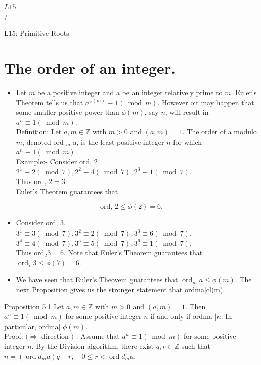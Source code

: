 \documentclass[10pt]{article}
\begin{document}
$L 15$\\
/

L15: Primitive Roots

\section*{The order of an integer.}
\begin{itemize}
  \item Let $m$ be a positive integer and a be an integer relatively prime to $m$. Euler's Theorem tells us that $a^{\phi(m)} \equiv 1(\bmod m)$. However oit may happen that some smaller positive power than $\phi(m)$, say $n$, will result in $a^{n} \equiv 1(\bmod m)$.\\
Definition: Let $a, m \in \mathbb{Z}$ with $m>0$ and $(a, m)=1$. The order of a modulo $m$, denoted ord ${ }_{m}$ a, is the least positive integer $n$ for which $a^{n} \equiv 1(\bmod m)$.\\
Example:- Consider ord, 2 . $2^{1} \equiv 2(\bmod 7), 2^{2} \equiv 4(\bmod 7), 2^{3} \equiv 1(\bmod 7)$.\\
Thus ord, $2=3$.\\
Euler's Theorem guarantees that
\end{itemize}

$$
\text { ord, } 2 \leqslant \phi(2)=6 \text {. }
$$

\begin{itemize}
  \item Consider ord, 3.\\
$3^{1} \equiv 3(\bmod 7), 3^{2} \equiv 2(\bmod 7), 3^{3} \equiv 6(\bmod 7)$,\\
$3^{4} \equiv 4(\bmod 7), 3^{5} \equiv 5(\bmod 7), 3^{6} \equiv 1(\bmod 7)$.\\
Thus $\mathrm{ord}_{2} 3=6$. Note that Euler's Theorem guarantees that $\operatorname{ord}_{7} 3 \leqslant \phi(7)=6$.
  \item We have seen that Euler's Theovem guarantees that $\operatorname{ord}_{m} a \leqslant \phi(m)$. The next Proposition gives us the stronger statement that ordma|cl(m).
\end{itemize}

Proposition 5.1 Let $a, m \in \mathbb{Z}$ with $m>0$ and $(a, m)=1$. Then $a^{n} \equiv 1(\bmod m)$ for some positive integer $n$ if and only if ordma $\mid n$. In particular, ordma| $\phi(m)$.\\
Proof: $(\Rightarrow$ direction $)$ : Assume that $a^{n} \equiv 1(\bmod m)$ for some positive integer $n$. By the Division algorithm, there exist $q, r \in \mathbb{Z}$ such that $n=\left(\operatorname{ord} d_{m} a\right) q+r, \quad 0 \leqslant r<\operatorname{ord} d_{m} a$.
\end{document}
